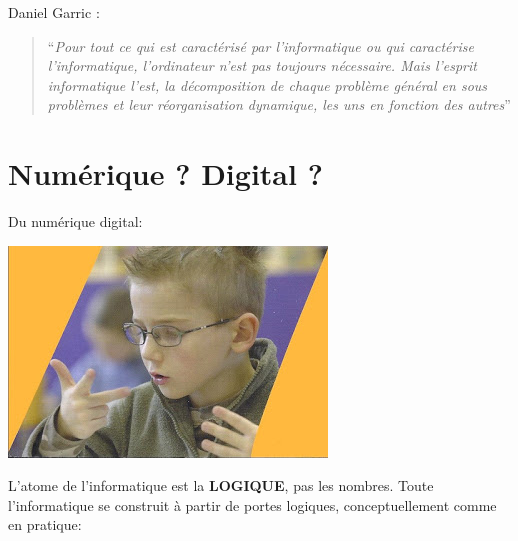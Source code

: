 \documentclass[french]{beamer}
\begin{document}
\begin{frame}
Daniel Garric :

\begin{quote}
``\emph{Pour tout ce qui est caractérisé par l'informatique ou qui
caractérise l'informatique, l'ordinateur n'est pas toujours nécessaire.
Mais l'esprit informatique l'est, la décomposition de chaque problème
général en sous problèmes et leur réorganisation dynamique, les uns en
fonction des autres}''
\end{quote}

\end{frame}




\section{Numérique ? Digital ?}


\begin{frame}
    Du numérique digital:
  \begin{center}
    \includegraphics[height=.7\textheight]{./doigts.jpg}
  \end{center}
\end{frame}



\begin{frame}
L'atome de l'informatique est la \textbf{LOGIQUE}, pas les nombres.
Toute l'informatique se construit à partir de portes logiques,
conceptuellement comme en pratique:
\end{frame}
\end{document}
